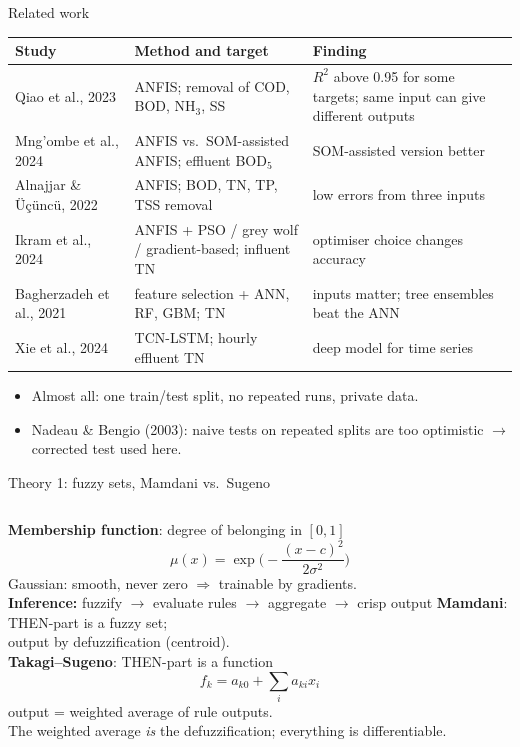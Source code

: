 \documentclass[aspectratio=169,10pt]{beamer}
\newcommand{\Rsq}{$R^2$}
\begin{document}
\begin{frame}{Related work}
\footnotesize
\begin{tabular}{p{3.2cm}p{4.6cm}p{5.4cm}}
\toprule Study & Method and target & Finding \\ \midrule
Qiao et al., 2023 & ANFIS; removal of COD, BOD, NH$_3$, SS & \Rsq{} above 0.95 for some targets; same input can give different outputs \\
Mng'ombe et al., 2024 & ANFIS vs.\ SOM-assisted ANFIS; effluent BOD$_5$ & SOM-assisted version better \\
Alnajjar \& \"U\c{c}\"unc\"u, 2022 & ANFIS; BOD, TN, TP, TSS removal & low errors from three inputs \\
Ikram et al., 2024 & ANFIS + PSO / grey wolf / gradient-based; influent TN & optimiser choice changes accuracy \\
Bagherzadeh et al., 2021 & feature selection + ANN, RF, GBM; TN & inputs matter; tree ensembles beat the ANN \\
Xie et al., 2024 & TCN-LSTM; hourly effluent TN & deep model for time series \\
\bottomrule
\end{tabular}
\normalsize\vspace{4mm}
\begin{itemize}
\item Almost all: one train/test split, no repeated runs, private data.
\item Nadeau \& Bengio (2003): naive tests on repeated splits are too optimistic $\rightarrow$ corrected test used here.
\end{itemize}
\end{frame}

\begin{frame}{Theory 1: fuzzy sets, Mamdani vs.\ Sugeno}
\begin{columns}[T]
\textbf{Membership function}: degree of belonging in $[0,1]$
\[\mu(x)=\exp\!\Big(-\frac{(x-c)^2}{2\sigma^2}\Big)\]
Gaussian: smooth, never zero $\Rightarrow$ trainable by gradients.\\[3mm]
\textbf{Inference:} fuzzify $\rightarrow$ evaluate rules $\rightarrow$ aggregate $\rightarrow$ crisp output
\textbf{Mamdani}: THEN-part is a fuzzy set;\\ output by defuzzification (centroid).\\[3mm]
\textbf{Takagi--Sugeno}: THEN-part is a function
\[f_k=a_{k0}+\textstyle\sum_i a_{ki}x_i\]
output = weighted average of rule outputs.\\ The weighted average \emph{is} the defuzzification; everything is differentiable.
\end{columns}
\end{frame}
\end{document}
